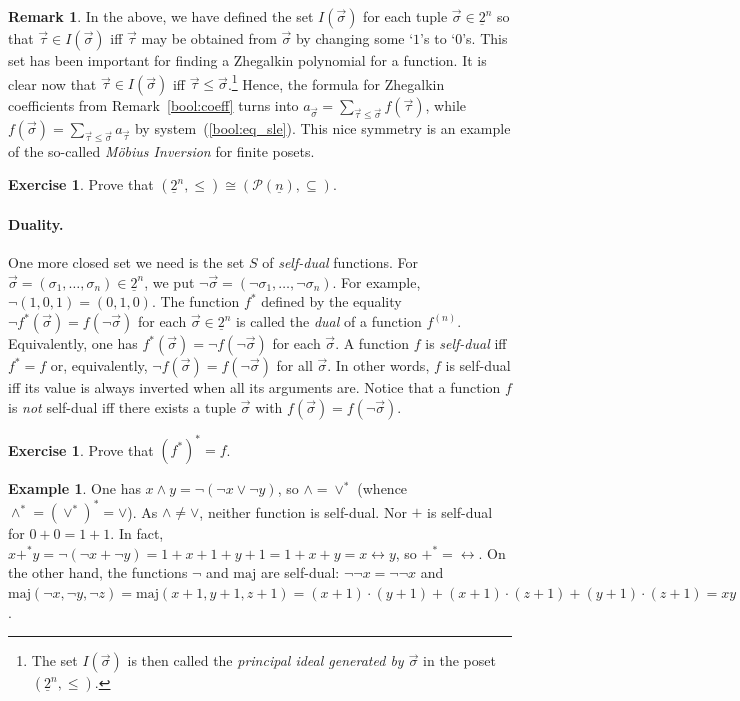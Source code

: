 \documentclass[12pt,notitlepage]{article}
\theoremstyle{plain}
\theoremstyle{definition}
\newtheorem{exc}[thm]{Exercise}
\newtheorem{exm}[thm]{Example}
\newtheorem{rem}[thm]{Remark}
\theoremstyle{plain}
\newcommand{\sbs}{\subseteq}
\newcommand{\mP}{\mathcal{P}}
\newcommand{\ul}[1]{\underline{#1}}
\newcommand{\1}{\mathbf{1}}
\newcommand{\0}{\mathbf{0}}
\begin{document}
\begin{rem}
In the above, we have defined the set $I(\vec \sigma)$ for each tuple $\vec \sigma \in \ul{2}^n$ so that $\vec \tau \in I(\vec\sigma)$ iff $\vec \tau$  may be obtained from $\vec \sigma$ by changing some `$1$'s to `$0$'s. This set has been important for finding a Zhegalkin polynomial for a function. It is clear now that $\vec \tau \in I(\vec \sigma)$ iff $\vec \tau \leq \vec \sigma$.\footnote{The set $I(\vec \sigma)$ is then called the \emph{principal ideal generated by $\vec \sigma$} in the poset $(\ul{2}^n, {\leq})$.} Hence, the formula for Zhegalkin coefficients from Remark~\ref{bool:coeff} turns into $a_{\vec \sigma} = \sum_{\vec\tau \leq \vec \sigma} f(\vec\tau)$, while $f(\vec \sigma) = \sum_{\vec\tau \leq \vec \sigma} a_{\vec\tau}$ by system~(\ref{bool:eq_sle}). This nice symmetry is an example of the so-called \emph{M\"obius Inversion} for finite posets.
\end{rem}
\begin{exc}
Prove that $(\ul{2}^n, {\leq}) \cong (\mP(\ul{n}), {\sbs})$.
\end{exc}

\paragraph{Duality.}
One more closed set we need is the set $S$ of \emph{self-dual} functions. For $\vec \sigma = (\sigma_1, \ldots, \sigma_n) \in \ul{2}^n$, we put $\neg\vec\sigma = (\neg\sigma_1, \ldots, \neg\sigma_n)$. For example, $\neg (1,0,1) = (0,1,0)$. The function $f^*$ defined by the equality $\neg f^*(\vec \sigma) = f(\neg\vec\sigma)$ for each $\vec \sigma \in \ul{2}^n$ is called the \emph{dual} of a function $f^{(n)}$. Equivalently, one has $f^*(\vec \sigma) = \neg f(\neg\vec\sigma)$ for each $\vec \sigma$. A function $f$ is \emph{self-dual} iff $f^* = f$ or, equivalently, $\neg f(\vec \sigma) = f(\neg\vec\sigma)$ for all $\vec \sigma$. In other words, $f$ is self-dual iff its value is always inverted when all its arguments are. Notice that a function $f$ is \emph{not} self-dual iff there exists a tuple $\vec\sigma$ with $f(\vec \sigma) = f(\neg\vec \sigma)$.

\begin{exc}
Prove that $(f^*)^* = f$.
\end{exc}

\begin{exm}
One has $x \wedge y = \neg (\neg x \vee \neg y )$, so $\wedge = \vee^*$ (whence ${\wedge^*}= ({\vee^*})^* = \vee$). As ${\wedge} \neq {\vee}$, neither function is self-dual. Nor ${+}$ is self-dual for $0 + 0 = 1 + 1$. In fact, $x +^* y = \neg(\neg x + \neg y) = 1 + x + 1 + y + 1 = 1 + x + y = x \leftrightarrow y$, so ${+^*} = {\leftrightarrow}$. On the other hand, the functions ${\neg}$ and $\mathrm {maj}$ are self-dual: $\neg \neg x = \neg \neg x$ and $\mathrm {maj}(\neg x, \neg y, \neg z) = \mathrm {maj}(x + 1, y + 1, z + 1) = (x + 1)\cdot(y + 1) + (x + 1)\cdot(z + 1) + (y + 1)\cdot(z + 1) = xy + xz + yz + x + x + y + y + z + z + 1 + 1 + 1 = xy + xz + yz + 1 = \neg \mathrm {maj}(x,y,z)$.
\end{exm}
\end{document}
